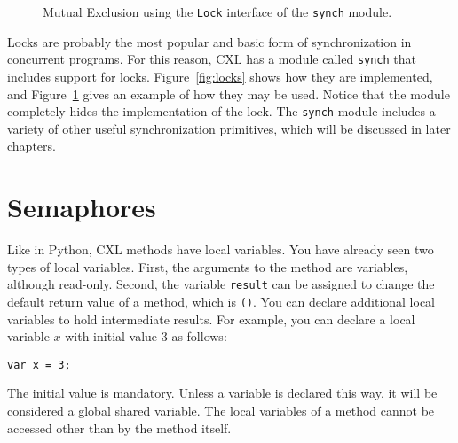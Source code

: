 \documentclass{report}
\newenvironment{code}{
\tcolorbox
}{
\endtcolorbox
}
\begin{document}
\begin{figure}
\begin{code}

\end{code}
\caption{Mutual Exclusion using the \texttt{Lock} interface of the \texttt{synch} module.}
\label{fig:lockme}
\end{figure}

Locks are probably the most popular and basic form of synchronization
in concurrent programs.  For this reason, CXL has a module called
\texttt{synch} that includes support for locks.
Figure~\ref{fig:locks} shows how they are implemented, and
Figure~\ref{fig:lockme} gives an example of how they may be used.
Notice that the module completely hides the implementation of the
lock.
The \texttt{synch} module includes a variety of other useful
synchronization primitives, which will be discussed in later
chapters.

\chapter{Semaphores}

Like in Python, CXL methods have local variables.  You have already
seen two types of local variables.
First, the arguments to the method are variables, although read-only.
Second, the variable \texttt{result} can be assigned to
change the default return value of a method, which is \texttt{()}.
You can declare additional local variables to hold intermediate
results.  For example, you can
declare a local variable $x$ with initial value 3 as follows:
\begin{code}
\begin{verbatim}
var x = 3;
\end{verbatim}
\end{code}
The initial value is mandatory.
Unless a variable is declared this way, it will be considered
a global shared variable.
The local variables of a method cannot be accessed other than by
the method itself.
\end{document}
